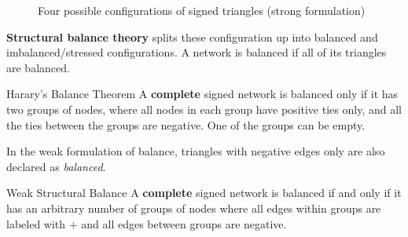 \documentclass[english]{panikzettel}
\begin{document}
\begin{figure}[ht!]
	\caption{Four possible configurations of signed triangles (strong formulation)}
	\label{fig:signed_network_triangles}
\end{figure}
\textbf{Structural balance theory} splits these configuration up into balanced and imbalanced/stressed configurations.
A network is balanced if all of its triangles are balanced.

\begin{theo}{Harary's Balance Theorem}
	A \textbf{complete} signed network is balanced only if it has two groups of nodes, where all nodes in each group have positive ties only, and all the ties between the groups are negative.
	One of the groups can be empty.
\end{theo}

In the weak formulation of balance, triangles with negative edges only are also declared as \textit{balanced}.

\begin{theo}{Weak Structural Balance}
	A \textbf{complete} signed network is balanced if and only if it has an arbitrary number of groups of nodes where all edges within groups are labeled with $ + $ and all edges between groups are negative.
\end{theo}
\end{document}
